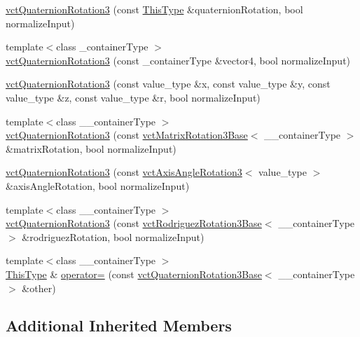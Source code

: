 \begin{DoxyCompactItemize}
\item 
\hyperlink{classvct_quaternion_rotation3_a2e3fe8a00490f42d6e74691e4f5139bd}{vct\-Quaternion\-Rotation3} (const \hyperlink{classvct_fixed_size_const_vector_base_a071063bc4fa43112cc287b2dbef53180}{This\-Type} \&quaternion\-Rotation, bool normalize\-Input)
\item 
{\footnotesize template$<$class \-\_\-container\-Type $>$ }\\\hyperlink{classvct_quaternion_rotation3_a7c5350f623b29acbc9078db984b8319d}{vct\-Quaternion\-Rotation3} (const \-\_\-container\-Type \&vector4, bool normalize\-Input)
\item 
\hyperlink{classvct_quaternion_rotation3_afd576b5562dd20b964669d560225a9d9}{vct\-Quaternion\-Rotation3} (const value\-\_\-type \&x, const value\-\_\-type \&y, const value\-\_\-type \&z, const value\-\_\-type \&r, bool normalize\-Input)
\item 
{\footnotesize template$<$class \-\_\-\-\_\-container\-Type $>$ }\\\hyperlink{classvct_quaternion_rotation3_a69bf1c8baea4d6a0cb9f044f6dd0957d}{vct\-Quaternion\-Rotation3} (const \hyperlink{classvct_matrix_rotation3_base}{vct\-Matrix\-Rotation3\-Base}$<$ \-\_\-\-\_\-container\-Type $>$ \&matrix\-Rotation, bool normalize\-Input)
\item 
\hyperlink{classvct_quaternion_rotation3_ad44748cd63f2d942d16631b521f00405}{vct\-Quaternion\-Rotation3} (const \hyperlink{classvct_axis_angle_rotation3}{vct\-Axis\-Angle\-Rotation3}$<$ value\-\_\-type $>$ \&axis\-Angle\-Rotation, bool normalize\-Input)
\item 
{\footnotesize template$<$class \-\_\-\-\_\-container\-Type $>$ }\\\hyperlink{classvct_quaternion_rotation3_a45571b22ed4aafd2c007220ff4d29916}{vct\-Quaternion\-Rotation3} (const \hyperlink{classvct_rodriguez_rotation3_base}{vct\-Rodriguez\-Rotation3\-Base}$<$ \-\_\-\-\_\-container\-Type $>$ \&rodriguez\-Rotation, bool normalize\-Input)
\item 
{\footnotesize template$<$class \-\_\-\-\_\-container\-Type $>$ }\\\hyperlink{classvct_fixed_size_const_vector_base_a071063bc4fa43112cc287b2dbef53180}{This\-Type} \& \hyperlink{classvct_quaternion_rotation3_a62f9e5b04da4936936ca38335ea17f92}{operator=} (const \hyperlink{classvct_quaternion_rotation3_base}{vct\-Quaternion\-Rotation3\-Base}$<$ \-\_\-\-\_\-container\-Type $>$ \&other)
\end{DoxyCompactItemize}
\subsection*{Additional Inherited Members}



